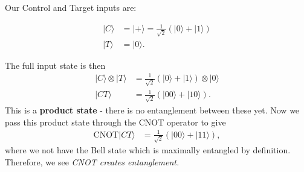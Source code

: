 \documentclass[a4paper, 11pt, normalem]{report}
\begin{document}
\begin{example}
    Our Control and Target inputs are:
    \begin{figure}[H]
    \begin{multicols}{2}
        \begin{center}
        \end{center}
    \columnbreak
    \begin{align}
        |C\rangle &= |+\rangle = \frac{1}{\sqrt{2}}\left(|0\rangle+|1\rangle\right) \\
        |T\rangle &= |0\rangle.
    \end{align}
    \end{multicols}
    \end{figure}
    \vspace{-2em}
    The full input state is then
    \begin{align}
        |C\rangle\otimes|T\rangle &= \frac{1}{\sqrt{2}}\left(|0\rangle+|1\rangle\right)\otimes|0\rangle \\
                       |CT\rangle &= \frac{1}{\sqrt{2}}\left(|00\rangle+|10\rangle\right).
    \end{align}
    This is a \textbf{product state} - there is no entanglement between these yet.
    Now we pass this product state through the CNOT operator to give
    \begin{align}
        \text{CNOT}|CT\rangle &= \frac{1}{\sqrt{2}}\left(|00\rangle+|11\rangle\right),
    \end{align}
    where we not have the Bell state which is maximally entangled by definition.
    Therefore, we see \textit{CNOT creates entanglement.}


\end{example}
\end{document}
